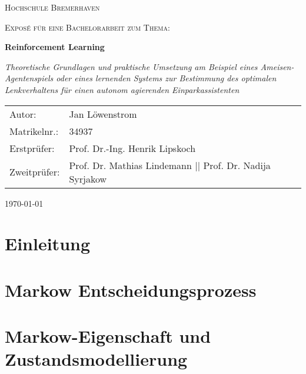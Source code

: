 \documentclass[12pt]{article}
\begin{document}
\begin{titlepage}
	\centering	
	{\scshape\LARGE Hochschule Bremerhaven \par}
	\vspace{1cm}
	{\scshape\Large Exposé für eine Bachelorarbeit zum Thema:\par}
	\vspace{1.5cm}
	{\huge\bfseries Reinforcement Learning\par}
	\vspace{2cm}
	{\Large\itshape Theoretische Grundlagen und praktische Umsetzung am Beispiel
	eines Ameisen-Agentenspiels oder eines lernenden Systems zur Bestimmung des optimalen
	Lenkverhaltens für einen autonom agierenden Einparkassistenten
	\par}
	\vfill
	\begin{tabularx}{\textwidth}{lX}
		Autor: & Jan Löwenstrom \\
		Matrikelnr.: & 34937 \\
		Erstprüfer: & Prof. Dr.-Ing. Henrik Lipskoch \\
		Zweitprüfer: & Prof. Dr. Mathias Lindemann || Prof. Dr. Nadija Syrjakow \\
	\end{tabularx}  
    \vfill

	{\large \today \par}       
\end{titlepage}

\tableofcontents
\pagebreak
\listoffigures
\newpage


\noindent
\section{Einleitung}


\pagebreak

\section{Markow Entscheidungsprozess}

\pagebreak

\section{Markow-Eigenschaft und Zustandsmodellierung}

\pagebreak


\pagebreak
\end{document}
